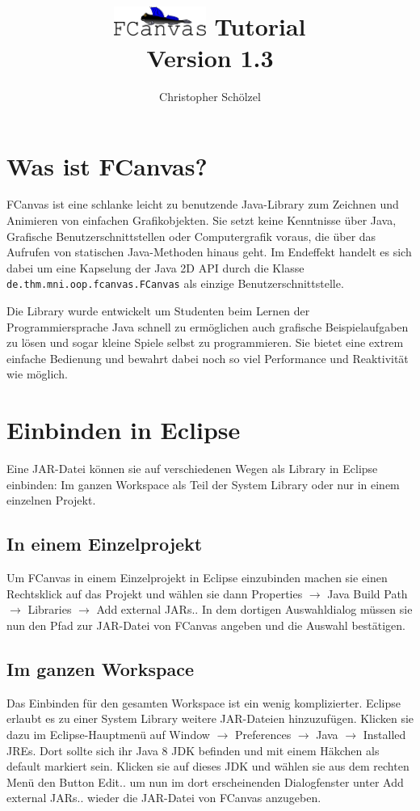 \documentclass{article}
\title{\includegraphics[width=3cm]{img/fcanvas-draft06-final.pdf} Tutorial\\\large Version 1.3}
\author{Christopher Schölzel}
\newcommand{\enquote}[1]{\glqq{}#1\grqq{}}
\begin{document}
\maketitle

\tableofcontents

\section{Was ist FCanvas?}
FCanvas ist eine schlanke leicht zu benutzende Java-Library zum Zeichnen und Animieren von einfachen Grafikobjekten. Sie setzt keine Kenntnisse über Java, Grafische Benutzerschnittstellen oder Computergrafik voraus, die über das Aufrufen von statischen Java-Methoden hinaus geht. Im Endeffekt handelt es sich dabei um eine Kapselung der Java 2D API durch die Klasse {\tt de.thm.mni.oop.fcanvas.FCanvas} als einzige Benutzerschnittstelle.

Die Library wurde entwickelt um Studenten beim Lernen der Programmiersprache Java schnell zu ermöglichen auch grafische Beispielaufgaben zu lösen und sogar kleine Spiele selbst zu programmieren. Sie bietet eine extrem einfache Bedienung und bewahrt dabei noch so viel Performance und Reaktivität wie möglich.

\section{Einbinden in Eclipse}
Eine JAR-Datei können sie auf verschiedenen Wegen als Library in Eclipse einbinden: Im ganzen Workspace als Teil der System Library oder nur in einem einzelnen Projekt.

\subsection{In einem Einzelprojekt}
Um FCanvas in einem Einzelprojekt in Eclipse einzubinden machen sie einen Rechtsklick auf das Projekt und wählen sie dann Properties $\rightarrow$ Java Build Path  $\rightarrow$ Libraries $\rightarrow$ Add external JARs.. In dem dortigen Auswahldialog müssen sie nun den Pfad zur JAR-Datei von FCanvas angeben und die Auswahl bestätigen.

\subsection{Im ganzen Workspace}
Das Einbinden für den gesamten Workspace ist ein wenig komplizierter. Eclipse erlaubt es zu einer System Library weitere JAR-Dateien hinzuzufügen. Klicken sie dazu im Eclipse-Hauptmenü auf Window $\rightarrow$ Preferences  $\rightarrow$ Java  $\rightarrow$ Installed JREs. Dort sollte sich ihr Java 8 JDK befinden und mit einem Häkchen als default markiert sein. Klicken sie auf dieses JDK und wählen sie aus dem rechten Menü den Button \enquote{Edit..} um nun im dort erscheinenden Dialogfenster unter \enquote{Add external JARs..} wieder die JAR-Datei von FCanvas anzugeben.
\end{document}
